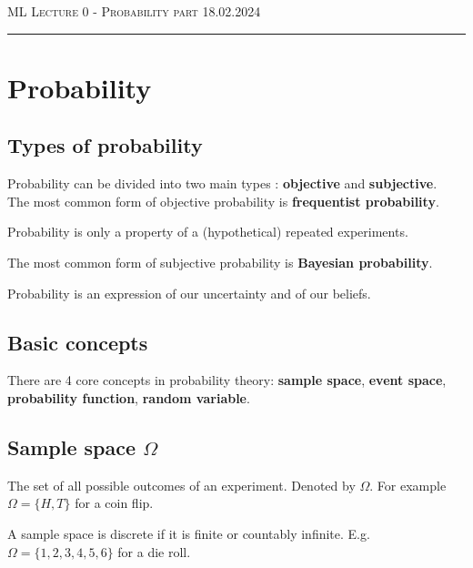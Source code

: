 \documentclass[12pt]{article}
\begin{document}
\thispagestyle{empty}

{\scshape ML } \hfill {\scshape \large Lecture 0 - Probability part} \hfill {\scshape 18.02.2024}
 
\smallskip
\hrule
\bigskip

\section{Probability}

\subsection{Types of probability}
Probability can be divided into two main types : \textbf{objective} and \textbf{subjective}. \\
The most common form of objective probability is \textbf{frequentist probability}. 
\begin{definition}
    Probability is only a property of a (hypothetical) repeated experiments.
\end{definition}

The most common form of subjective probability is \textbf{Bayesian probability}.
\begin{definition}
    Probability is an expression of our uncertainty and of our beliefs.
\end{definition}

\subsection{Basic concepts}
There are 4 core concepts in probability theory: \textbf{sample space}, \textbf{event space}, \textbf{probability function}, \textbf{random variable}.

\subsection{Sample space $\Omega$}

\begin{definition}
    The set of all possible outcomes of an experiment. Denoted by $\Omega$. For example $\Omega = \{H, T\}$ for a coin flip.
\end{definition}

\begin{definition}
    A sample space is discrete if it is finite or countably infinite. E.g. $\Omega = \{1, 2, 3, 4, 5, 6\}$ for a die roll.
\end{definition}
\end{document}
